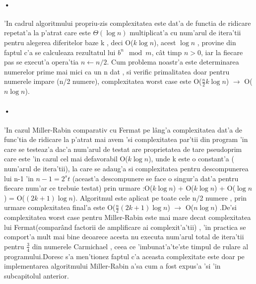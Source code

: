 \documentclass[12pt,twoside]{article}
\numberwithin{figure}{section}
\begin{document}
\paragraph{•}
'In cadrul algoritmului propriu-zis complexitatea este dat'a de functia de ridicare repetat'a la p'atrat care este $\Theta(\log n)$ multiplicat'a cu num'arul de itera'tii pentru alegerea diferitelor baze k , deci O($k \log n$), acest $\log n$ , provine din faptul c'a se calculeaza rezultatul lui $ b^n \mod m$, c\^at timp $n>0$, iar la fiecare pas se execut'a opera'tia $n \gets n/2$. Cum problema noastr'a este determinarea numerelor prime mai mici ca un n dat , si verific primalitatea doar pentru numerele impare (n/2 numere), complexitatea worst case este O($\frac{n}{2}  k \log n$) $\to$ O($n \log n$).

\begin{description}[font=$\bullet$~\normalfont\scshape\color{black!50!black}]
\item [Algoritmul Miller-Rabin]
\end{description}
\paragraph{•}
'In cazul Miller-Rabin comparativ cu Fermat pe l\^ang'a complexitatea dat'a de func'tia de ridicare la p'atrat mai avem 'si complexitatea par'tii din program 'in care se testeaz'a dac'a num'arul de testat are proprietatea de tare pseudoprim care este 'in cazul cel mai defavorabil O($k\log n$), unde k este o constant'a ( num'arul de itera'tii), la care se adaug'a si complexitatea pentru descompunerea lui n-1 'in $n-1 = 2^s t$ (aceast'a descompunere se face o singur'a dat'a pentru fiecare num'ar ce trebuie testat) prin urmare :O($k\log n$) + O($k\log n$)  + O($\log n$) = O($(2k+1)\log n$). Algoritmul este aplicat pe toate cele n/2 numere , prin urmare complexitatea final'a este O($\frac{n}{2} (2k+1) \log n$) $\to$ O($n \log n$) .De'si complexitatea worst case pentru Miller-Rabin este mai mare decat complexitatea lui Fermat(compar\^and factorii de amplificare ai complexit'a'tii) , 'in practica se comport'a mult mai bine deoarece acesta nu executa num'arul total de itera'tii pentru $\frac{3}{4}$ din numerele Carmichael , ceea ce 'imbunat'a'te'ste timpul de rulare al programului.Doresc s'a men'tionez faptul c'a aceasta complexitate este doar pe implementarea algoritmului Miller-Rabin a'sa cum a fost expus'a 'si 'in subcapitolul anterior. 


\begin{description}[font=$\bullet$~\normalfont\scshape\color{black!50!black}]
\item [Algoritmul Iterativ]
\end{description}
\end{document}
